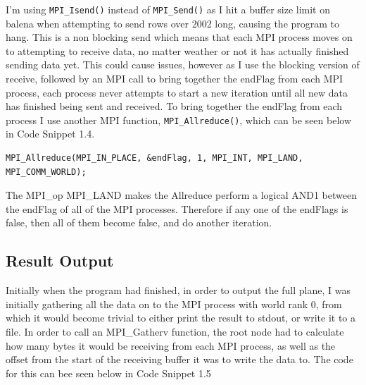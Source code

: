 \documentclass{report}
\begin{document}
I'm using \lstinline[style=customc]|MPI_Isend()| instead of \lstinline[style=customc]|MPI_Send()| as I hit a buffer size limit on balena when attempting to send rows over 2002 long, causing the program to hang. This is a non blocking send which means that each MPI process moves on to attempting to receive data, no matter weather or not it has actually finished sending data yet. This could cause issues, however as I use the blocking version of receive, followed by an MPI call to bring together the endFlag from each MPI process, each process never attempts to start a new iteration until all new data has finished being sent and received. To bring together the endFlag from each process I use another MPI function, \lstinline[style=customc]|MPI_Allreduce()|, which can be seen below in Code Snippet 1.4.

\begin{lstlisting}[style=customc,caption=MPI Communication]
    MPI_Allreduce(MPI_IN_PLACE, &endFlag, 1, MPI_INT, MPI_LAND, MPI_COMM_WORLD);
\end{lstlisting}

The MPI\_op MPI\_LAND makes the Allreduce perform a logical AND1 between the endFlag of all of the MPI processes. Therefore if any one of the endFlags is false, then all of them become false, and do another iteration.

\subsection{Result Output}
Initially when the program had finished, in order to output the full plane, I was initially gathering all the data on to the MPI process with world rank 0, from which it would become trivial to either print the result to stdout, or write it to a file. In order to call an MPI\_Gatherv function, the root node had to calculate how many bytes it would be receiving from each MPI process, as well as the offset from the start of the receiving buffer it was to write the data to. The code for this can bee seen below in Code Snippet 1.5
\end{document}
